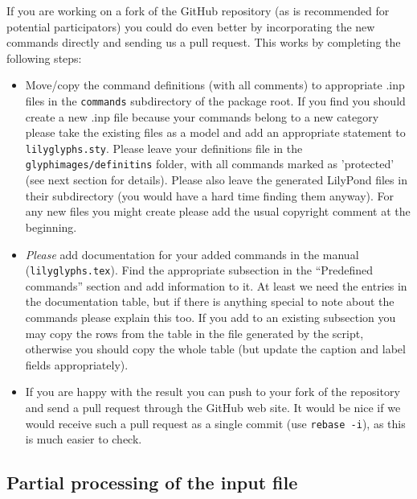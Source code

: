 \documentclass{OLLbook}
\begin{document}
If you are working on a fork of the GitHub repository (as is recommended for potential participators) you could do even better by incorporating the new commands directly and sending us a pull request.
This works by completing the following steps:
\begin{itemize}
\item Move/copy the command definitions (with all comments) to appropriate .inp files in the \texttt{commands} subdirectory of the package root.
If you find you should create a new .inp file because your commands belong to a new category please take the existing files as a model and add an appropriate  statement to \texttt{lilyglyphs.sty}.
Please leave your definitions file in the \texttt{glyphimages/definitins} folder, with all commands marked as 'protected' (see next section for details).
Please also leave the generated LilyPond files in their subdirectory (you would have a hard time finding them anyway).
For any new files you might create please add the usual copyright comment at the beginning.
\item \emph{Please} add documentation for your added commands in the manual (\texttt{lilyglyphs.tex}).
Find the appropriate subsection in the “Predefined commands” section and add information to it.
At least we need the entries in the documentation table, but if there is anything special to note about the commands please explain this too.
If you add to an existing subsection you may copy the rows from the table in the file generated by the script, otherwise you should copy the whole table (but update the caption and label fields appropriately).
\item If you are happy with the result you can push to your fork of the repository and send a pull request through the GitHub web site.
It would be nice if we would receive such a pull request as a single commit (use \texttt{rebase -i}), as this is much easier to check.
\end{itemize}


\subsection{Partial processing of the input file}
\label{subsec:BGI_partial_processing}
\end{document}
